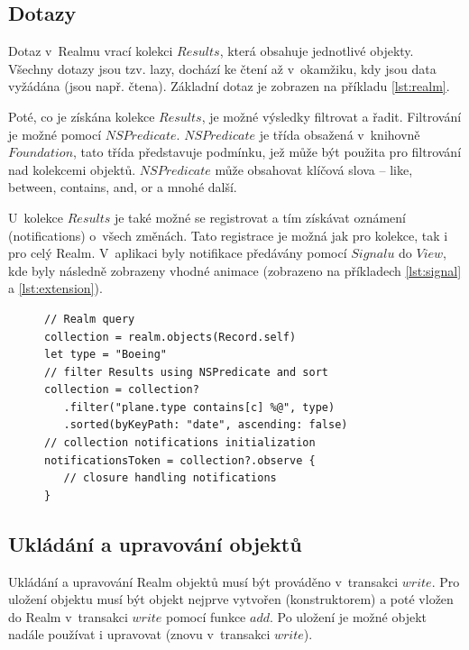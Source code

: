 \documentclass[thesis=M,czech]{FITthesis}[2012/06/26]
\begin{document}
\subsection{Dotazy}
Dotaz v~Realmu vrací kolekci $Results$, která obsahuje jednotlivé objekty. Všechny dotazy jsou tzv. lazy, dochází ke čtení až v~okamžiku, kdy jsou data vyžádána (jsou např. čtena). \cite{realmDocs} Základní dotaz je zobrazen na příkladu \ref{lst:realm}.

Poté, co je získána kolekce $Results$, je možné výsledky filtrovat a řadit. Filtrování je možné pomocí $NSPredicate$. \cite{realmDocs} $NSPredicate$ je třída obsažená v~knihovně $Foundation$, tato třída představuje podmínku, jež může být použita pro filtrování nad kolekcemi objektů. $NSPredicate$ může obsahovat klíčová slova -- like, between, contains, and, or a mnohé další. \cite{predicate}

U~kolekce $Results$ je také možné se registrovat a tím získávat oznámení (notifications) o~všech změnách. Tato registrace je možná jak pro kolekce, tak i pro celý Realm. \cite{realmDocs} V~aplikaci byly notifikace předávány pomocí $Signalu$ do $View$, kde byly následně zobrazeny vhodné animace (zobrazeno na příkladech \ref{lst:signal} a \ref{lst:extension}).

\begin{figure}
\begin{minipage}{\linewidth}
\begin{lstlisting}[caption={Ukázka dotazu v~Realmu},label={lst:realm}]
// Realm query
collection = realm.objects(Record.self)
let type = "Boeing"
// filter Results using NSPredicate and sort
collection = collection?
   .filter("plane.type contains[c] %@", type)
   .sorted(byKeyPath: "date", ascending: false)
// collection notifications initialization
notificationsToken = collection?.observe {
   // closure handling notifications
}
\end{lstlisting}
\end{minipage}
\end{figure}

\subsection{Ukládání a upravování objektů}
Ukládání a upravování Realm objektů musí být prováděno v~transakci $write$. Pro uložení objektu musí být objekt nejprve vytvořen (konstruktorem) a poté vložen do Realm v~transakci $write$ pomocí funkce $add$. Po uložení je možné objekt nadále používat i upravovat (znovu v~transakci $write$). \cite{realmDocs}
\end{document}
